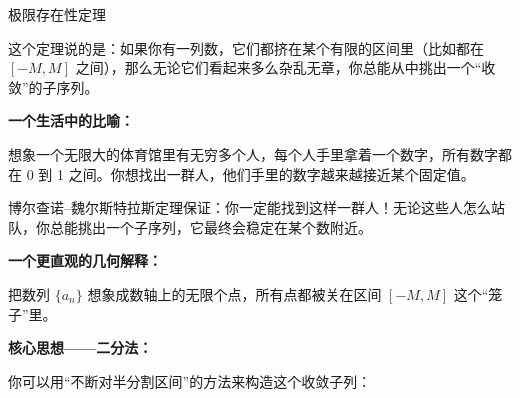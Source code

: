 \documentclass[aspectratio=169,10pt,fontset=fandol]{ctexbeamer}
\begin{document}
\begin{frame}[t,fragile]{极限存在性定理}
\normalsize
{\normalsize
这个定理说的是：如果你有一列数，它们都挤在某个有限的区间里（比如都在 \([-M, M]\) 之间），那么无论它们看起来多么杂乱无章，你总能从中挑出一个“收敛”的子序列。



\textbf{一个生活中的比喻：}



想象一个无限大的体育馆里有无穷多个人，每个人手里拿着一个数字，所有数字都在 0 到 1 之间。你想找出一群人，他们手里的数字越来越接近某个固定值。



博尔查诺--魏尔斯特拉斯定理保证：你一定能找到这样一群人！无论这些人怎么站队，你总能挑出一个子序列，它最终会稳定在某个数附近。



\textbf{一个更直观的几何解释：}



把数列 \(\{a_n\}\) 想象成数轴上的无限个点，所有点都被关在区间 \([-M, M]\) 这个“笼子”里。



\begin{center}


\end{center}



\textbf{核心思想——二分法：}



你可以用“不断对半分割区间”的方法来构造这个收敛子列：



}
\end{frame}
\end{document}
